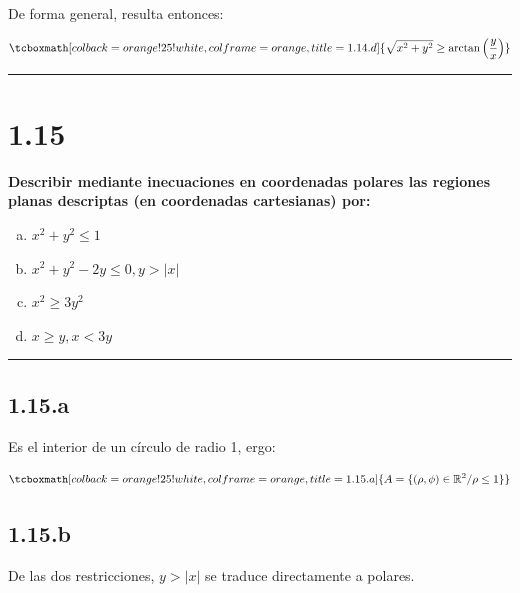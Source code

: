 \documentclass{article}
\renewcommand{\Bbb}{\mathbb}
\begin{document}
De forma general, resulta entonces:

\begin{equation}
\tcboxmath[colback=orange!25!white,colframe=orange,title=1.14.d]
{ \sqrt{x^2 + y^2} \geq \arctan \left( \frac{y}{x} \right) }
\end{equation}

\hrule
\vspace{10 pt}

\section*{1.15}
\label{sec:1.15}

\textbf{Describir mediante inecuaciones en coordenadas polares las regiones planas descriptas (en coordenadas cartesianas) por:}

\begin{enumerate}[(a)]
\bfseries
\item $x^2 + y^2 \leq 1$

\item $x^2 + y^2 - 2y \leq 0, y > |x|$

\item $x^2 \geq 3y^2$

\item $x \geq y, x < 3y$
\end{enumerate}
\hrule

\subsection*{1.15.a}
\label{subsec:1.15.a}

Es el interior de un círculo de radio 1, ergo:

\begin{equation}
\tcboxmath[colback=orange!25!white,colframe=orange,title=1.15.a]
{ A = \{ (\rho, \phi) \in \Bbb R^2 / \rho \leq 1 \} }
\end{equation}

\subsection*{1.15.b}
\label{subsec:1.15.b}

De las dos restricciones, $y > |x|$ se traduce directamente a polares.
\end{document}
